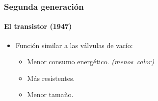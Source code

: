 \documentclass[11pt,a4paper,spanish]{beamer}
\begin{document}
\begin{frame}

\frametitle{Segunda generación}
\framesubtitle{El transistor (1947)}

\begin{minipage}{0.66\textwidth}

    \begin{itemize}
        \item Función similar a las válvulas de vacío:
        \begin{itemize}
            \item Menor consumo energético.
                \emph{\tiny{(menos~calor)}}
            \item Más resistentes.
            \item Menor tamaño.
        \end{itemize}
    \end{itemize}

\end{minipage}
~
\begin{minipage}{0.3\textwidth}


\end{minipage}
\end{frame}
\end{document}
